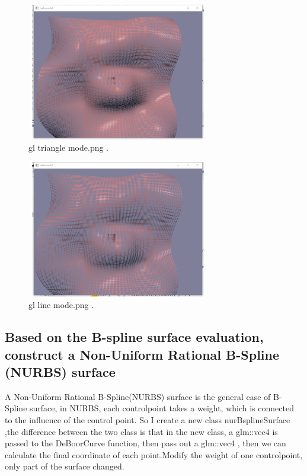 \documentclass[acmtog]{acmart}
\begin{document}
\begin{figure}[h]
	\centering
	\includegraphics[width=8cm,height=6cm]{gl triangle mode.png}
	\caption{gl triangle mode.png .}
\end{figure}

\begin{figure}[h]
	\centering
	\includegraphics[width=8cm,height=6cm]{gl line mode.png}
	\caption{gl line mode.png .}
\end{figure}

\subsection{Based on the B-spline surface evaluation, construct a Non-Uniform Rational B-Spline (NURBS) surface}
A Non-Uniform Rational B-Spline(NURBS) surface is the general case of B-Spline surface, in NURBS, each controlpoint takes a weight, which is connected to the influence of the control point. So I create a new class nurBsplineSurface ,the difference between the two class is that in the new class, a glm::vec4 is passed to the DeBoorCurve function, then pass out a glm::vec4 , then we can calculate the final coordinate of each point.Modify the weight of one controlpoint, only part of the surface changed.
\end{document}
